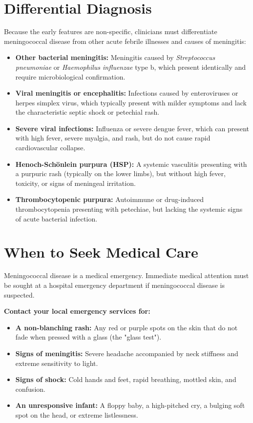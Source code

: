 \section*{Differential Diagnosis}
Because the early features are non-specific, clinicians must differentiate meningococcal disease from other acute febrile illnesses and causes of meningitis:
\begin{itemize}
    \item \textbf{Other bacterial meningitis:} Meningitis caused by \textit{Streptococcus pneumoniae} or \textit{Haemophilus influenzae} type b, which present identically and require microbiological confirmation.
    \item \textbf{Viral meningitis or encephalitis:} Infections caused by enteroviruses or herpes simplex virus, which typically present with milder symptoms and lack the characteristic septic shock or petechial rash.
    \item \textbf{Severe viral infections:} Influenza or severe dengue fever, which can present with high fever, severe myalgia, and rash, but do not cause rapid cardiovascular collapse.
    \item \textbf{Henoch-Sch\"{o}nlein purpura (HSP):} A systemic vasculitis presenting with a purpuric rash (typically on the lower limbs), but without high fever, toxicity, or signs of meningeal irritation.
    \item \textbf{Thrombocytopenic purpura:} Autoimmune or drug-induced thrombocytopenia presenting with petechiae, but lacking the systemic signs of acute bacterial infection.
\end{itemize}

\section*{When to Seek Medical Care}
Meningococcal disease is a medical emergency. Immediate medical attention must be sought at a hospital emergency department if meningococcal disease is suspected.

\textbf{Contact your local emergency services for:}
\begin{itemize}
    \item \textbf{A non-blanching rash:} Any red or purple spots on the skin that do not fade when pressed with a glass (the "glass test").
    \item \textbf{Signs of meningitis:} Severe headache accompanied by neck stiffness and extreme sensitivity to light.
    \item \textbf{Signs of shock:} Cold hands and feet, rapid breathing, mottled skin, and confusion.
    \item \textbf{An unresponsive infant:} A floppy baby, a high-pitched cry, a bulging soft spot on the head, or extreme listlessness.
\end{itemize}


